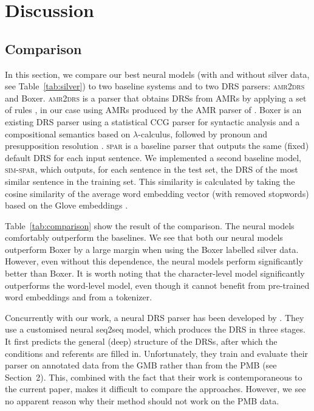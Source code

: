\documentclass[11pt,a4paper]{article}
\begin{document}
\section{Discussion}
\label{sec:discussion}

\subsection{Comparison}

In this section, we compare our best neural models (with and without silver data, see Table~\ref{tab:silver}) to two baseline systems and to two DRS parsers: \textsc{amr2drs} and Boxer.
\textsc{amr2drs} is a parser that obtains DRSs from AMRs by applying a set of rules \cite{pmb-LREC:18}, in our case using AMRs produced by the AMR parser of .
Boxer is an existing DRS parser using a statistical CCG parser for syntactic analysis and a compositional semantics based on $\lambda$-calculus, followed by pronoun and presupposition resolution \cite{candcboxer:2007,step2008:boxer}.
\textsc{spar} is a baseline parser that outputs the same (fixed) default DRS for each input sentence. 
We implemented a second baseline model, \textsc{sim-spar}, which outputs, for each sentence in the test set, the DRS of the most similar sentence in the training set. This similarity is calculated by taking the cosine similarity of the average word embedding vector (with removed stopwords) based on the Glove embeddings \cite{glove:14}. 

Table~\ref{tab:comparison} show the result of the comparison.
The neural models comfortably outperform the baselines.
We see that both our neural models outperform Boxer by a large margin when using the Boxer labelled silver data. However, even without this dependence, the neural models perform significantly better than Boxer.
It is worth noting that the character-level model significantly outperforms the word-level model, even though it cannot benefit from pre-trained word embeddings and from a tokenizer. 

Concurrently with our work, a neural DRS parser has been developed by . They use a customised neural
seq2seq model, which produces the DRS in three stages. It first predicts the general (deep) structure of the DRSs, after which the conditions and referents are filled in. 
Unfortunately, they train and evaluate their parser on annotated data from the GMB rather than from the PMB (see Section~2). This, combined with the fact that their work is contemporaneous to the current paper, makes it difficult to compare the approaches. However, we see no apparent reason why their method should not work on the PMB data.
\end{document}
